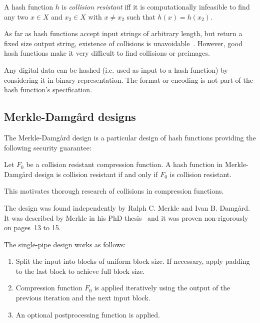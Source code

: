 \begin{defi}
  A hash function $h$ is \emph{collision resistant} iff it is computationally infeasible to
  find any two $x \in X$ and $x_2 \in X$ with $x \neq x_2$ such that $h(x) = h(x_2)$.
\end{defi}

As far as hash functions accept input strings of arbitrary length, but return a fixed
size output string, existence of collisions is unavoidable~\cite{schlaffer}.
However, good hash functions make it very difficult to find collisions or preimages.

Any digital data can be hashed (i.e. used as input to a hash function) by considering
it in binary representation. The format or encoding is not part of the hash function's
specification.

\subsection{Merkle-Damg\aa{}rd designs}
\label{sec:hash-md}
%
The Merkle-Damg\aa{}rd design is a particular design of hash functions providing the
following security guarantee:

\begin{defi}
  Let $F_0$ be a collision resistant compression function.
  A hash function in Merkle-Damg\aa{}rd design is collision resistant if and only if $F_0$ is collision resistant.
\end{defi}

This motivates thorough research of collisions in compression functions.

The design was found independently by Ralph C. Merkle and Ivan B. Damg\aa{}rd.
It was described by Merkle in his PhD thesis~\cite{merkle1979secrecy} and it
was proven non-rigorously on pages~13 to 15.

The single-pipe design works as follows:
\begin{enumerate}
\item Split the input into blocks of uniform block size.
  If necessary, apply padding to the last block to achieve full block size.
\item Compression function $F_0$ is applied iteratively using the output of
  the previous iteration and the next input block.
\item An optional postprocessing function is applied.
\end{enumerate}

